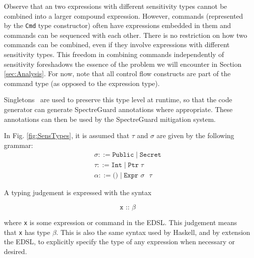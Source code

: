 \documentclass[10pt, conference]{IEEEtran}
\newcommand{\ttt}{\texttt}
\begin{document}
Observe that an two expressions with different sensitivity types cannot be
combined into a larger compound expression. However, commands (represented by
the \verb|Cmd| type constructor) often have expressions embedded in them and
commands can be sequenced with each other.  There is no restriction on how two
commands can be combined, even if they involve expressions with different
sensitivity types. This freedom in combining commands independently of
sensitivity foreshadows the essence of the problem we will encounter in
Section \ref{sec:Analysis}. For now, note that all control flow constructs are
part of the command type (as opposed to the expression type).

Singletons~\cite{Singletons} are used to preserve this type level at runtime, so that the
code generator can generate SpectreGuard annotations where appropriate. These annotations can
then be used by the SpectreGuard mitigation system.~\cite{SpectreGuard}

In Fig. \ref{fig:SensTypes}, it is assumed that $\tau$ and $\sigma$ are given by the
following grammar:
\begin{gather*}
  \sigma ::= \ttt{Public}\;|\;\ttt{Secret}\\
  \tau ::= \ttt{Int}\;|\;\ttt{Ptr}\;\tau\\
  \alpha ::= \ttt{()}\;|\;\ttt{Expr $\sigma$ $\tau$}
\end{gather*}

\noindent A typing judgement is expressed with the syntax

\begin{equation*}
  \ttt{x :: $\beta$}
\end{equation*}

\noindent where \ttt{x} is some expression or command in the EDSL. This judgement means
that \ttt{x} has type $\beta$. This is also the same syntax used by Haskell, and by extension
the EDSL, to explicitly specify the type of any expression when necessary or desired.
\end{document}
